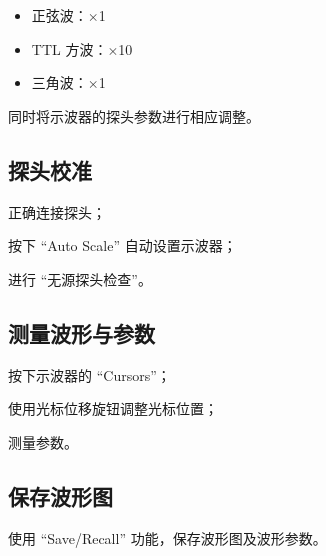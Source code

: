 \documentclass[a4paper]{article}
\begin{document}
			\begin{itemize}
				\item 正弦波：$\times$1
				\item TTL 方波：$\times$10
				\item 三角波：$\times$1
			\end{itemize}

			\par 同时将示波器的探头参数进行相应调整。

		\subsection{探头校准}

			\par 正确连接探头；
			\par 按下 “Auto Scale” 自动设置示波器；
			\par 进行 “无源探头检查”。

		\subsection{测量波形与参数}

			\par 按下示波器的 “Cursors”；
			\par 使用光标位移旋钮调整光标位置；
			\par 测量参数。

		\subsection{保存波形图}

			\par 使用 “Save/Recall” 功能，保存波形图及波形参数。
\end{document}
